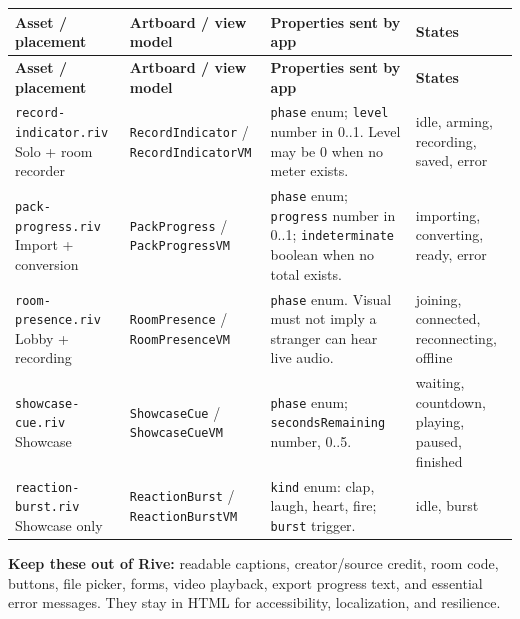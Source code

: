 \documentclass[10pt,a4paper]{article}
\begin{document}
\small
\renewcommand{\arraystretch}{1.15}
\begin{longtable}{@{}>{\raggedright\arraybackslash}p{36mm}>{\raggedright\arraybackslash}p{34mm}>{\raggedright\arraybackslash}p{60mm}>{\raggedright\arraybackslash}p{27mm}@{}}
\toprule
\textbf{Asset / placement} & \textbf{Artboard / view model} & \textbf{Properties sent by app} & \textbf{States}\\
\midrule\endfirsthead
\toprule\textbf{Asset / placement} & \textbf{Artboard / view model} & \textbf{Properties sent by app} & \textbf{States}\\\midrule\endhead
\texttt{record-indicator.riv} Solo + room recorder & \texttt{RecordIndicator} / \texttt{RecordIndicatorVM} & \texttt{phase} enum; \texttt{level} number in 0..1. Level may be 0 when no meter exists. & idle, arming, recording, saved, error\\
\texttt{pack-progress.riv} Import + conversion & \texttt{PackProgress} / \texttt{PackProgressVM} & \texttt{phase} enum; \texttt{progress} number in 0..1; \texttt{indeterminate} boolean when no total exists. & importing, converting, ready, error\\
\texttt{room-presence.riv} Lobby + recording & \texttt{RoomPresence} / \texttt{RoomPresenceVM} & \texttt{phase} enum. Visual must not imply a stranger can hear live audio. & joining, connected, reconnecting, offline\\
\texttt{showcase-cue.riv} Showcase & \texttt{ShowcaseCue} / \texttt{ShowcaseCueVM} & \texttt{phase} enum; \texttt{secondsRemaining} number, 0..5. & waiting, countdown, playing, paused, finished\\
\texttt{reaction-burst.riv} Showcase only & \texttt{ReactionBurst} / \texttt{ReactionBurstVM} & \texttt{kind} enum: clap, laugh, heart, fire; \texttt{burst} trigger. & idle, burst\\
\bottomrule
\end{longtable}
\renewcommand{\arraystretch}{1}
\normalsize
\begin{riskbox}
\textbf{Keep these out of Rive:} readable captions, creator/source credit, room code, buttons, file picker, forms, video playback, export progress text, and essential error messages. They stay in HTML for accessibility, localization, and resilience.
\end{riskbox}
\end{document}
